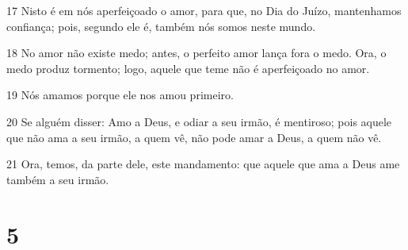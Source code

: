 \par 17 Nisto é em nós aperfeiçoado o amor, para que, no Dia do Juízo, mantenhamos confiança; pois, segundo ele é, também nós somos neste mundo.
\par 18 No amor não existe medo; antes, o perfeito amor lança fora o medo. Ora, o medo produz tormento; logo, aquele que teme não é aperfeiçoado no amor.
\par 19 Nós amamos porque ele nos amou primeiro.
\par 20 Se alguém disser: Amo a Deus, e odiar a seu irmão, é mentiroso; pois aquele que não ama a seu irmão, a quem vê, não pode amar a Deus, a quem não vê.
\par 21 Ora, temos, da parte dele, este mandamento: que aquele que ama a Deus ame também a seu irmão.

\chapter{5}

